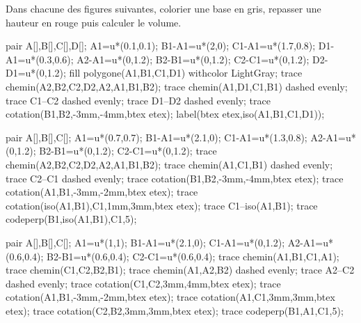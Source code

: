 \begin{exercice*} %
   Dans chacune des figures suivantes, colorier une base en gris, repasser une hauteur en rouge puis calculer le volume.
   
   \vspace*{-5mm}
   \begin{center}
   \begin{minipage}[t]{0.3\linewidth}
      \begin{Geometrie}
         pair A[],B[],C[],D[];
         A1=u*(0.1,0.1);
         B1-A1=u*(2,0);
         C1-A1=u*(1.7,0.8);
         D1-A1=u*(0.3,0.6);
         A2-A1=u*(0,1.2);
         B2-B1=u*(0,1.2);
         C2-C1=u*(0,1.2);
         D2-D1=u*(0,1.2);
         fill polygone(A1,B1,C1,D1) withcolor LightGray;
         trace chemin(A2,B2,C2,D2,A2,A1,B1,B2);
         trace chemin(A1,D1,C1,B1) dashed evenly;
         trace C1--C2 dashed evenly;
         trace D1--D2 dashed evenly;
         trace cotation(B1,B2,-3mm,-4mm,btex  etex);
         label(btex  etex,iso(A1,B1,C1,D1));
      \end{Geometrie}
   \end{minipage}
   \hfill
   \begin{minipage}[t]{0.3\linewidth}
      \begin{Geometrie}
         pair A[],B[],C[];
         A1=u*(0.7,0.7);
         B1-A1=u*(2.1,0);
         C1-A1=u*(1.3,0.8);
         A2-A1=u*(0,1.2);
         B2-B1=u*(0,1.2);
         C2-C1=u*(0,1.2);
         trace chemin(A2,B2,C2,D2,A2,A1,B1,B2);
         trace chemin(A1,C1,B1) dashed evenly;
         trace C2--C1 dashed evenly;
         trace cotation(B1,B2,-3mm,-4mm,btex  etex);
         trace cotation(A1,B1,-3mm,-2mm,btex  etex);
         trace cotation(iso(A1,B1),C1,1mm,3mm,btex  etex);
         trace C1--iso(A1,B1);
         trace codeperp(B1,iso(A1,B1),C1,5);
      \end{Geometrie}
   \end{minipage}
   \hfill
   \begin{minipage}[t]{0.3\linewidth}
      \begin{Geometrie}
         pair A[],B[],C[];
         A1=u*(1,1);
         B1-A1=u*(2.1,0);
         C1-A1=u*(0,1.2);
         A2-A1=u*(0.6,0.4);
         B2-B1=u*(0.6,0.4);
         C2-C1=u*(0.6,0.4);
         trace chemin(A1,B1,C1,A1);
         trace chemin(C1,C2,B2,B1);
         trace chemin(A1,A2,B2) dashed evenly;
         trace A2--C2 dashed evenly;
         trace cotation(C1,C2,3mm,4mm,btex  etex);
         trace cotation(A1,B1,-3mm,-2mm,btex  etex);
         trace cotation(A1,C1,3mm,3mm,btex  etex);
         trace cotation(C2,B2,3mm,3mm,btex  etex);
         trace codeperp(B1,A1,C1,5);
      \end{Geometrie}
   \end{minipage}


\end{center}
\end{exercice*}
